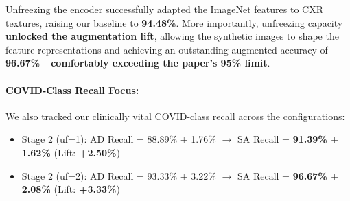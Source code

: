 \documentclass[11pt]{article}
\begin{document}
\begin{table}[htbp]
\centering
\caption{\textbf{Main Results: Paper, Stage 1 Reconstruction, and Stage 2 Improvements.} Accuracy results are evaluated on the same 192-image real test set. Stage 2 improved configurations report the mean and standard deviation over 5 independent seeds.}
\label{tab:main_results}
\end{table}

Unfreezing the encoder successfully adapted the ImageNet features to CXR textures, raising our baseline to \textbf{94.48\%}. More importantly, unfreezing capacity \textbf{unlocked the augmentation lift}, allowing the synthetic images to shape the feature representations and achieving an outstanding augmented accuracy of \textbf{96.67\%—comfortably exceeding the paper's 95\% limit}.

\paragraph{COVID-Class Recall Focus:}
We also tracked our clinically vital COVID-class recall across the configurations:
\begin{itemize}[nosep, leftmargin=1.5em]
  \item Stage 2 (uf=1): AD Recall = 88.89\% $\pm$ 1.76\% $\rightarrow$ SA Recall = \textbf{91.39\% $\pm$ 1.62\%} (Lift: \textbf{+2.50\%})
  \item Stage 2 (uf=2): AD Recall = 93.33\% $\pm$ 3.22\% $\rightarrow$ SA Recall = \textbf{96.67\% $\pm$ 2.08\%} (Lift: \textbf{+3.33\%})
\end{itemize}
\end{document}
